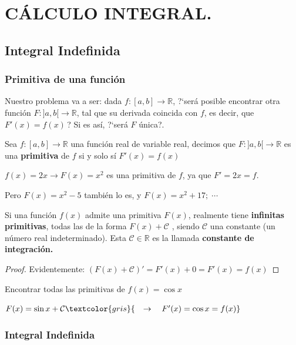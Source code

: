 \part{CÁLCULO INTEGRAL.}
\chapter{Integral Indefinida}
	
\section{Primitiva de una función}

Nuestro problema va a ser: dada $f:[a,b]\to \mathbb R$, ?`será posible encontrar otra función $F:]a,b[\to \mathbb R$, tal que su derivada coincida con $f$, es decir, que $F'(x)=f(x)\,$? Si es así, ?`será $F$ única?.

\begin{defi}
Sea $f:[a,b]\to \mathbb R$ una función real de variable real, decimos que 	$F:]a,b[\to \mathbb R$ es una \textbf{primitiva} de $f$ si y solo sí $F'(x)=f(x)$
\end{defi}

\begin{ejem}
$f(x)=2x \to F(x)=x^2$ es una primitiva de $f$, ya que $F'=2x=f$.

Pero $F(x)=x^2-5$ también lo es, y $F(x)=x^2+17 ; \; \cdots$

\end{ejem}

\begin{teor} 
Si una función $f(x)$ admite una primitiva $F(x)$, realmente tiene \textbf{infinitas primitivas}, todas las de la forma $F(x)+\mathcal C$	, siendo $\mathcal C$ una constante (un número real indeterminado). Esta $\mathcal C \in \mathbb R$ es la llamada \textbf{constante de integración.}
\end{teor}
\begin{proof}
Evidentemente: $ \left( F(x)+\mathcal C  \right)'=F'(x)+0=F'(x)=f(x)$
\end{proof}

\begin{ejem}
	Encontrar todas las primitivas de $f(x)=\cos x$
	
	$F(x)=\sin x + \mathcal C \textcolor{gris}{\quad \to \quad F'(x)=\cos x = f(x)}$
\end{ejem}

\section{Integral Indefinida}

